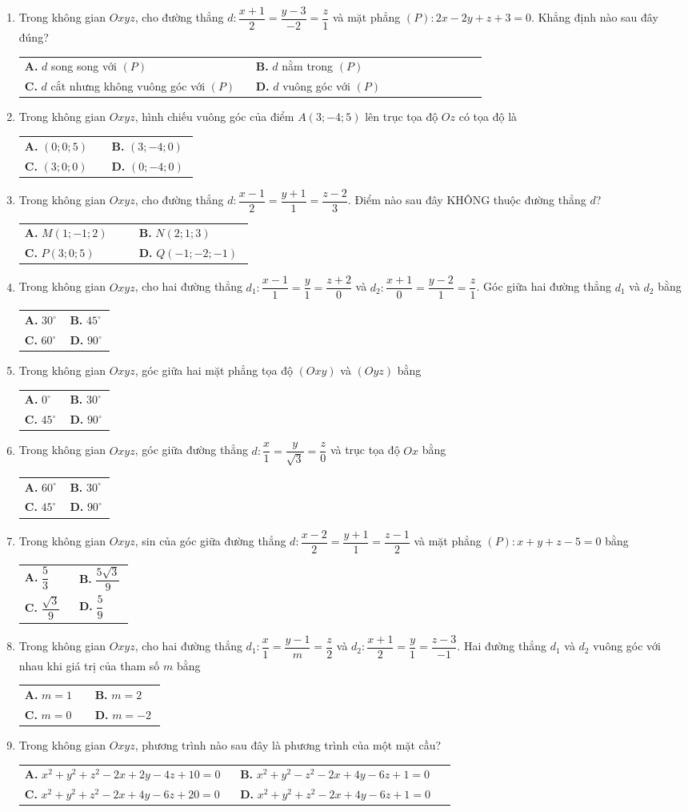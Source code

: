 \documentclass[12pt,a4paper]{article}
\makeatletter
\newcommand{\bonpa}[4]{\par\nobreak\smallskip\nobreak\noindent
\begin{tabular}{@{}p{0.48\linewidth}p{0.48\linewidth}@{}}
\textbf{A.} #1 & \textbf{B.} #2\\[8pt]
\textbf{C.} #3 & \textbf{D.} #4\end{tabular}}
\makeatother
\begin{document}
\begin{enumerate}
\item Trong không gian $Oxyz$, cho đường thẳng $d: \dfrac{x+1}{2} = \dfrac{y-3}{-2} = \dfrac{z}{1}$ và mặt phẳng $(P): 2x - 2y + z + 3 = 0$. Khẳng định nào sau đây đúng?
\bonpa{$d$ song song với $(P)$}{$d$ nằm trong $(P)$}{$d$ cắt nhưng không vuông góc với $(P)$}{$d$ vuông góc với $(P)$}

\item Trong không gian $Oxyz$, hình chiếu vuông góc của điểm $A(3; -4; 5)$ lên trục tọa độ $Oz$ có tọa độ là
\bonpa{$(0; 0; 5)$}{$(3; -4; 0)$}{$(3; 0; 0)$}{$(0; -4; 0)$}

\item Trong không gian $Oxyz$, cho đường thẳng $d: \dfrac{x-1}{2} = \dfrac{y+1}{1} = \dfrac{z-2}{3}$. Điểm nào sau đây KHÔNG thuộc đường thẳng $d$?
\bonpa{$M(1; -1; 2)$}{$N(2; 1; 3)$}{$P(3; 0; 5)$}{$Q(-1; -2; -1)$}

\item Trong không gian $Oxyz$, cho hai đường thẳng $d_1: \dfrac{x-1}{1} = \dfrac{y}{1} = \dfrac{z+2}{0}$ và $d_2: \dfrac{x+1}{0} = \dfrac{y-2}{1} = \dfrac{z}{1}$. Góc giữa hai đường thẳng $d_1$ và $d_2$ bằng
\bonpa{$30^\circ$}{$45^\circ$}{$60^\circ$}{$90^\circ$}

\item Trong không gian $Oxyz$, góc giữa hai mặt phẳng tọa độ $(Oxy)$ và $(Oyz)$ bằng
\bonpa{$0^\circ$}{$30^\circ$}{$45^\circ$}{$90^\circ$}

\item Trong không gian $Oxyz$, góc giữa đường thẳng $d: \dfrac{x}{1} = \dfrac{y}{\sqrt{3}} = \dfrac{z}{0}$ và trục tọa độ $Ox$ bằng
\bonpa{$60^\circ$}{$30^\circ$}{$45^\circ$}{$90^\circ$}

\item Trong không gian $Oxyz$, sin của góc giữa đường thẳng $d: \dfrac{x-2}{2} = \dfrac{y+1}{1} = \dfrac{z-1}{2}$ và mặt phẳng $(P): x + y + z - 5 = 0$ bằng
\bonpa{$\dfrac{5}{3}$}{$\dfrac{5\sqrt{3}}{9}$}{$\dfrac{\sqrt{3}}{9}$}{$\dfrac{5}{9}$}

\item Trong không gian $Oxyz$, cho hai đường thẳng $d_1: \dfrac{x}{1} = \dfrac{y-1}{m} = \dfrac{z}{2}$ và $d_2: \dfrac{x+1}{2} = \dfrac{y}{1} = \dfrac{z-3}{-1}$. Hai đường thẳng $d_1$ và $d_2$ vuông góc với nhau khi giá trị của tham số $m$ bằng
\bonpa{$m = 1$}{$m = 2$}{$m = 0$}{$m = -2$}

\item Trong không gian $Oxyz$, phương trình nào sau đây là phương trình của một mặt cầu?
\bonpa{$x^2 + y^2 + z^2 - 2x + 2y - 4z + 10 = 0$}{$x^2 + y^2 - z^2 - 2x + 4y - 6z + 1 = 0$}{$x^2 + y^2 + z^2 - 2x + 4y - 6z + 20 = 0$}{$x^2 + y^2 + z^2 - 2x + 4y - 6z + 1 = 0$}


\end{enumerate}
\end{document}

